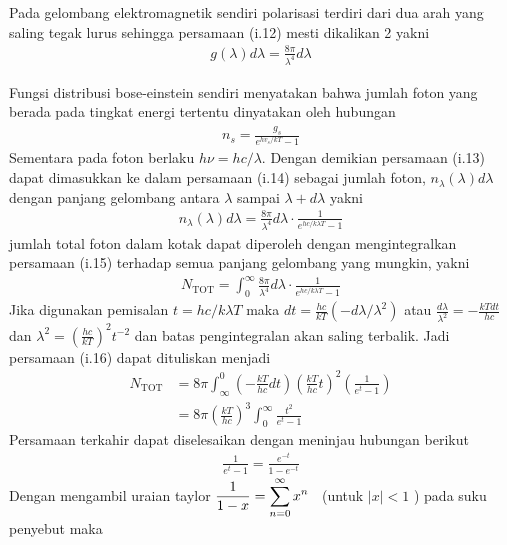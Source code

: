 \documentclass[a4paper , 12 pt]{article}
\begin{document}
\begin{enumerate}
Pada gelombang elektromagnetik sendiri polarisasi terdiri dari dua arah yang saling tegak lurus sehingga persamaan (i.12) mesti dikalikan 2 yakni
\begin{align}
g(\lambda) d \lambda  = \frac{8 \pi}{\lambda^4} d \lambda \tag{i.13}
\end{align}

Fungsi distribusi bose-einstein sendiri menyatakan bahwa jumlah foton yang berada pada tingkat energi  tertentu dinyatakan oleh hubungan  
\begin{align}
n_s = \frac{g_s}{e^{h v_s/kT} - 1} \tag{i.14}
\end{align}
Sementara pada foton berlaku $h\nu = h c /\lambda $. Dengan demikian persamaan (i.13) dapat dimasukkan ke dalam persamaan  (i.14)  sebagai jumlah foton, $n_\lambda (\lambda) d \lambda$ dengan panjang gelombang antara $\lambda$ sampai $\lambda + d \lambda $ yakni
\begin{align}
n_\lambda (\lambda) d \lambda = \frac{8 \pi}{\lambda^4} d \lambda \cdot \frac{1}{e^{hc/ k \lambda T} - 1} \tag{i.15}
\end{align}
jumlah total foton dalam kotak dapat diperoleh dengan mengintegralkan persamaan (i.15) terhadap semua panjang gelombang yang mungkin, yakni 
\begin{align}
N_\mathrm{TOT} = \int_{0}^\infty \frac{8 \pi}{\lambda^4}d\lambda \cdot \frac{1}{e^{hc/k \lambda T} - 1} \nonumber \tag{i.16}
\end{align}
Jika digunakan pemisalan  $\displaystyle t = hc/ k\lambda T$ maka $ \displaystyle dt = \frac{hc}{kT}(-d\lambda / \lambda^2)$ atau $\displaystyle \frac{d\lambda }{\lambda^2} = - \frac{ kT dt}{hc}$ dan $\displaystyle \lambda^2 = \left(\frac{hc}{kT}\right)^2 t^{-2}$ dan batas pengintegralan akan saling terbalik. Jadi persamaan (i.16) dapat dituliskan menjadi
\begin{align}
N_\mathrm{TOT} & = 8\pi \int_\infty^0 \left(- \frac{kT}{hc} dt \right) \left( \frac{kT }{hc} t\right)^2 \left( \frac{1}{e^t - 1}\right) \nonumber \\
& = 8\pi \left(\frac{kT}{hc }\right)^3 \int_{0}^{\infty} \frac{t^2}{e^t -1} \nonumber \tag{i.17}
\end{align}
Persamaan terkahir dapat diselesaikan dengan meninjau hubungan berikut
\begin{align}
\frac{1}{e^t - 1} = \frac{e^{-t}}{1- e^{-t}}  \tag{i.18}
\end{align}
Dengan mengambil uraian taylor $\displaystyle \frac{1}{1 - x} = \sum_{n=0}^\infty x^n \hspace{0.3 cm} $(untuk $ |x| < 1$ ) pada suku penyebut maka

\end{enumerate}
\end{document}
